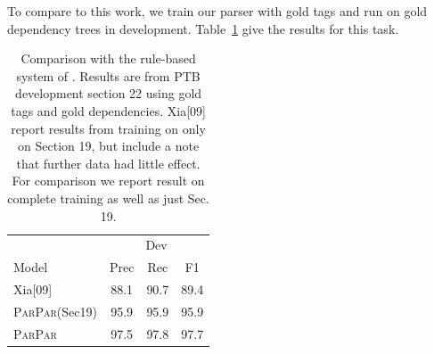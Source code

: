 \documentclass[11pt,letterpaper]{article}
\newcommand{\ParseName}{\textsc{ParPar}}
\begin{document}
To compare to this work, we train our parser with gold tags and run on gold dependency trees in development. Table~\ref{tab:convert} give the results for this task.


\begin{table}
  \centering
  \begin{tabular}{|l|ccc|}

    \hline
    & \multicolumn{3}{|c|}{Dev} \\
    Model & Prec & Rec & F1  \\
    \hline

    \hline
    Xia[09]     & 88.1 & 90.7 & 89.4 \\
    \ParseName(Sec19)  & 95.9 & 95.9 & 95.9    \\
    \ParseName  & 97.5 & 97.8 & 97.7    \\
    \hline

  \end{tabular}
  \caption{Comparison with the rule-based system of .
    Results are from PTB development section 22 using gold tags and gold
    dependencies.
    Xia[09] report results from training on only on Section 19, but
    include a note that further data had little effect.
    For comparison we report result on complete training as well as just Sec. 19.
  }
  \label{tab:convert}
\end{table}




\end{document}
